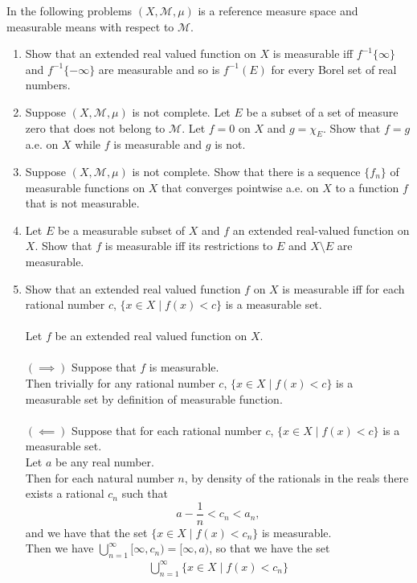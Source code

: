 In the following problems $(X,\mathcal{M},\mu)$ is a reference measure space and measurable means with respect to $\mathcal{M}$.
\begin{enumerate}
	\setcounter{enumi}{0}
    \item Show that an extended real valued function on $X$ is measurable iff $f^{-1}\{\infty\}$ and $f^{-1}\{-\infty\}$ are measurable and so is $f^{-1}(E)$ for every Borel set of real numbers.
    \item Suppose $(X,\mathcal{M},\mu)$ is not complete.
    Let $E$ be a subset of a set of measure zero that does not belong to $\mathcal{M}$.
    Let $f=0$ on $X$ and $g=\chi_E$.
    Show that $f=g$ a.e. on $X$ while $f$ is measurable and $g$ is not.
    \item Suppose $(X,\mathcal{M},\mu)$ is not complete.
    Show that there is a sequence $\{f_n\}$ of measurable functions on $X$ that converges pointwise a.e. on $X$ to a function $f$ that is not measurable.
    \item Let $E$ be a measurable subset of $X$ and $f$ an extended real-valued function on $X$.
    Show that $f$ is measurable iff its restrictions to $E$ and $X\setminus E$ are measurable.
    \item Show that an extended real valued function $f$ on $X$ is measurable iff for each rational number $c$, $\{x\in X\mid f(x)<c\}$ is a measurable set.\\
    \\Let $f$ be an extended real valued function on $X$.\\
    \\$(\implies)$ Suppose that $f$ is measurable.
    \\Then trivially for any rational number $c$, $\{x\in X\mid f(x)<c\}$ is a measurable set by definition of measurable function.\\
    \\$(\impliedby)$ Suppose that for each rational number $c$, $\{x\in X\mid f(x)<c\}$ is a measurable set.
    \\Let $a$ be any real number.
    \\Then for each natural number $n$, by density of the rationals in the reals there exists a rational $c_n$ such that 
    \[
        a-\frac{1}{n}<c_n< a_n,
    \]
    and we have that the set $\{x\in X\mid f(x)<c_n\}$ is measurable.
    \\Then we have $\bigcup_{n=1}^\infty[\infty,c_n)=[\infty,a)$, so that we have the set
    \begin{align*}
        \bigcup_{n=1}^\infty\{x\in X\mid f(x)<c_n\}

\end{align*}
\end{enumerate}
